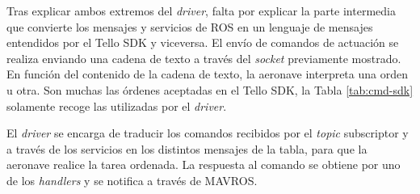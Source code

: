 \documentclass[../main.tex]{subfiles}
\begin{document}
\begin{figure}[!ht]
 	{}
\end{figure}

\newpage
Tras explicar ambos extremos del \emph{driver}, falta por explicar la parte intermedia que convierte los mensajes y servicios de ROS en un lenguaje de mensajes entendidos por el Tello SDK y viceversa. El envío de comandos de actuación se realiza enviando una cadena de texto a través del \emph{socket} previamente mostrado. En función del contenido de la cadena de texto, la aeronave interpreta una orden u otra. Son muchas las órdenes aceptadas en el Tello SDK, la Tabla \ref{tab:cmd-sdk} solamente recoge las utilizadas por el \emph{driver}.

El \emph{driver} se encarga de traducir los comandos recibidos por el \emph{topic} subscriptor y a través de los servicios en los distintos mensajes de la tabla, para que la aeronave realice la tarea ordenada. La respuesta al comando se obtiene por uno de los \emph{handlers} y se notifica a través de MAVROS.
\end{document}
